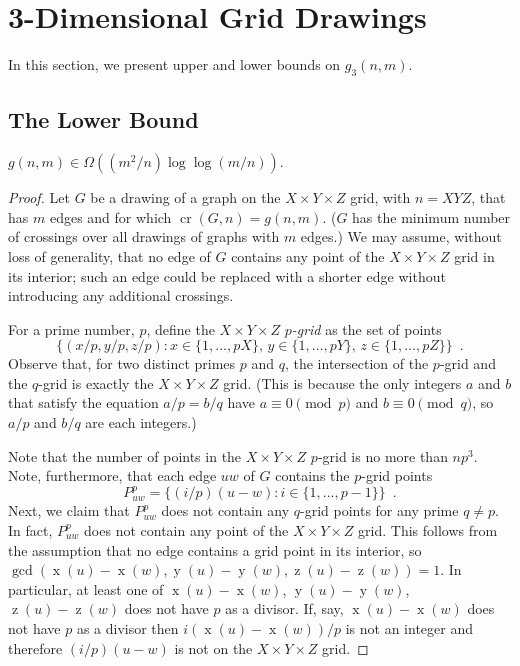 \documentclass{patmorin}
\DeclareMathOperator{\x}{x}
\DeclareMathOperator{\y}{y}
\DeclareMathOperator{\z}{z}
\DeclareMathOperator{\crs}{cr}
\begin{document}
\section{3-Dimensional Grid Drawings}

In this section, we present upper and lower bounds on $g_3(n,m)$.

\subsection{The Lower Bound}

\begin{thm}
  $g(n,m) \in \Omega((m^2/n)\log\log (m/n))$.
\end{thm}

\begin{proof}
Let $G$ be a drawing of a graph on the $X\times Y\times Z$ grid, with
$n=XYZ$, that has $m$ edges and for which $\crs(G,n)=g(n,m)$. ($G$
has the minimum number of crossings over all drawings of graphs with
$m$ edges.)  We may assume, without loss of generality, that no edge of
$G$ contains any point of the $X\times Y\times Z$ grid in its interior;
such an edge could be replaced with a shorter edge without introducing
any additional crossings.

For a prime number, $p$, define the $X\times Y\times Z$ \emph{$p$-grid}
as the set of points
\[
  \{(x/p,y/p,z/p): x\in\{1,\ldots,pX\},\, y\in\{1,\ldots,pY\},\,
  z\in\{1,\ldots,pZ\}\} \enspace .
\]
Observe that, for two distinct primes $p$ and $q$, the intersection
of the $p$-grid and the $q$-grid is exactly the $X\times Y\times Z$
grid. (This is because the only integers $a$ and $b$ that satisfy the
equation $a/p = b/q$ have $a\equiv 0 \pmod{p}$ and $b\equiv 0\pmod q$,
so $a/p$ and $b/q$ are each integers.)

Note that the number of points in the $X\times Y\times Z$ $p$-grid is
no more than $np^3$.  Note, furthermore, that each edge $uw$ of $G$
contains the $p$-grid points
\[
    P_{uw}^p = \{ (i/p)(u-w) : i\in\{1,\ldots,p-1\} \} \enspace .
\]
Next, we claim that $P_{uw}^p$ does not contain any $q$-grid points for
any prime $q\neq p$.  In fact, $P_{uw}^p$ does not contain any point of
the $X\times Y\times Z$ grid.  This follows from the assumption that
no edge contains a grid point in its interior, so $\gcd(\x(u)-\x(w),
\y(u)-\y(w), \z(u)-\z(w))=1$.  In particular, at least one of
$\x(u)-\x(w)$, $\y(u)-\y(w)$, $\z(u)-\z(w)$ does not have $p$ as a
divisor.  If, say, $\x(u)-\x(w)$ does not have $p$ as a divisor then
$i(\x(u)-\x(w))/p$ is not an integer and therefore $(i/p)(u-w)$ is not
on the $X\times Y\times Z$ grid.


\end{proof}
\end{document}
